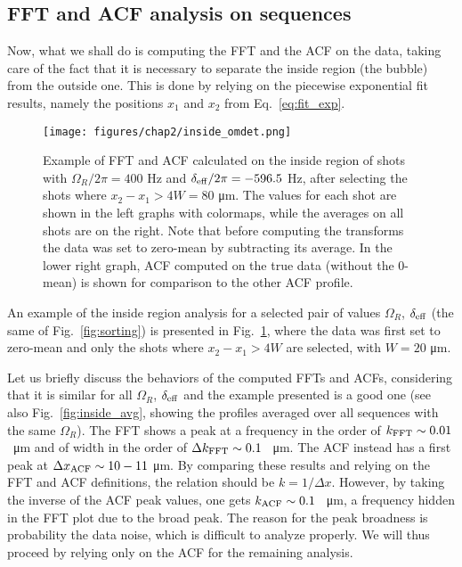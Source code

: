 \subsection{FFT and ACF analysis on sequences}
Now, what we shall do is computing the FFT and the ACF on the data, taking care of the fact that it is necessary to separate the inside region (the bubble) from the outside one. This is done by relying on the piecewise exponential fit results, namely the positions $x_1$ and $x_2$ from Eq.\ \eqref{eq:fit_exp}.
\begin{figure}[ht!]
    \centering
    \texttt{[image: figures/chap2/inside\_omdet.png]}
    \caption{Example of FFT and ACF calculated on the inside region of shots with $\Omega_R/2\pi = 400$ \unit{\hertz} and $\delta_{\rm eff}/2\pi = -596.5$ \unit{\hertz}, after selecting the shots where $x_2-x_1 > 4W = 80$ \unit{\micro\meter}. The values for each shot are shown in the left graphs with colormaps, while the averages on all shots are on the right. Note that before computing the transforms the data was set to zero-mean by subtracting its average. In the lower right graph, ACF computed on the true data (without the 0-mean) is shown for comparison to the other ACF profile.}
    \label{fig:inside_00}
\end{figure}
An example of the inside region analysis for a selected pair of values $\Omega_R$, $\delta_{\rm eff}$ (the same of Fig.\ \ref{fig:sorting}) is presented in Fig.\ \ref{fig:inside_00}, where the data was first set to zero-mean and only the shots where $x_2-x_1 > 4W$ are selected, with $W = 20$ \unit{\micro\meter}.

Let us briefly discuss the behaviors of the computed FFTs and ACFs, considering that it is similar for all $\Omega_R$, $\delta_{\rm eff}$ and the example presented is a good one (see also Fig.\ \ref{fig:inside_avg}, showing the profiles averaged over all sequences with the same $\Omega_R$). The FFT shows a peak at a frequency in the order of $k_{\rm FFT} \sim 0.01$ \unit{\per\micro\meter} and of width in the order of $\Delta k_{\rm FFT} \sim 0.1$ \unit{\per\micro\meter}. The ACF instead has a first peak at $\Delta x_{\rm ACF} \sim 10-11$ \unit{\micro\meter}. By comparing these results and relying on the FFT and ACF definitions, the relation should be $k = 1/\Delta x$. However, by taking the inverse of the ACF peak values, one gets $k_{\rm ACF} \sim 0.1$ \unit{\per\micro\meter}, a frequency hidden in the FFT plot due to the broad peak. The reason for the peak broadness is probability the data noise, which is difficult to analyze properly. We will thus proceed by relying only on the ACF for the remaining analysis.

